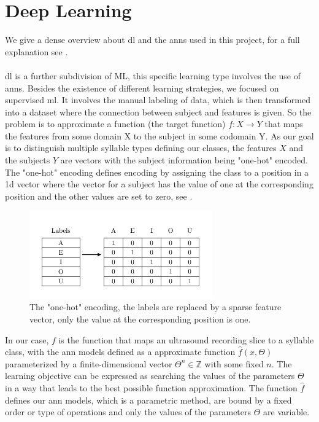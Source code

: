 \section{Deep Learning}
We give a dense overview about \gls{dl} and the \glspl{ann} used in this project, for a full explanation see \cite{Goodfellow-et-al-2016,nielsen2015neural}.\\\\

\Gls{dl} is a further subdivision of ML, this specific learning type involves the use of \glspl{ann}.
Besides the existence of different learning strategies, we focused on supervised \gls{ml}.
It involves the manual labeling of data, which is then transformed into a dataset where the connection between subject and features is given. So the problem is to approximate a function (the target function) $f\colon X \to Y$ that maps the features from some domain X to the subject in some codomain Y.
As our goal is to distinguish multiple syllable types defining our classes, the features $X$ and the subjects $Y$ are vectors with the subject information being "one-hot" encoded. The "one-hot" encoding defines encoding by assigning the class to a position in a 1d vector where the vector for a subject has the value of one at the corresponding position and the other values are set to zero, see .

\begin{figure}[ht!]
\centering
  \includegraphics[width=0.7\textwidth]{image/one-hot_encoding.pdf}\hfill
  \caption{The "one-hot" encoding, the labels are replaced by a sparse feature vector, only the value at the corresponding position is one.}
  \label{fig:one-hot_encoding}
\end{figure}

In our case, $f$ is the function that maps an ultrasound recording slice to a syllable class, with the \gls{ann} models defined as a approximate function $\hat{f}(x, \Theta)$ parameterized by a finite-dimensional vector $\Theta^n \in \mathbb{Z}$ with some fixed $n$. The learning objective can be expressed as searching the values of the parameters $\Theta$ in a way that leads to the best possible function approximation.
The function $\hat{f}$ defines our \gls{ann} models, which is a parametric method, are bound by a fixed order or type of operations and only the values of the parameters $\Theta$ are variable.

